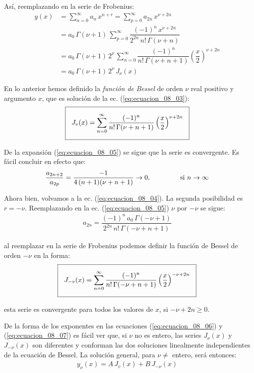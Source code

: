 Así, reemplazando en la serie de Frobenius:
\begin{align*}
y(x) &= \sum_{n=0}^{\infty} a_{n} \, x^{n+r} = \sum_{p=0}^{\infty} a_{2n} \, x^{\nu+2n} \\[0.5em]
&= a_{0} \, \Gamma (\nu + 1) \, \sum_{p=0}^{\infty} \dfrac{(-1)^{n} \, x^{\nu+2n}}{2^{2n} \, n! \, \Gamma (\nu + n)} \\[0.5em]
&= a_{0} \, \Gamma (\nu + 1) \, 2^{\nu} \, \sum_{n=0}^{\infty} \dfrac{(-1)^{n}}{n! \, \Gamma (\nu + n + 1)} \left( \dfrac{x}{2} \right)^{\nu+2n} \\[0.5em]
&= a_{0} \, \Gamma (\nu + 1) \, 2^{\nu} \, J_{\nu} (x)
\end{align*}

En lo anterior hemos definido la \emph{función de Bessel} de orden $\nu$ real positivo y argumento $x$, que es solución de la ec. (\ref{eq:ecuacion_08_03}):
\begin{align}
\setlength{\fboxsep}{3\fboxsep}\boxed{
J_{v} (x) = \sum_{n=0}^{\infty} \dfrac{(-1)^{n}}{n! \, \Gamma (\nu + n + 1)} \left( \dfrac{x}{2} \right)^{\nu+2n}}
\label{eq:ecuacion_08_06}
\end{align}

De la expansión (\ref{eq:ecuacion_08_05}) se sigue que la serie es convergente. Es fácil concluir en efecto que:
\begin{align*}
\dfrac{a_{2n+2}}{a_{2p}} = \dfrac{-1}{4 \, (n+1)(\nu + n + 1)} \to 0,\hspace{1.5cm} \mbox{si } n \to \infty
\end{align*}

Ahora bien, volvamos a la ec. (\ref{eq:ecuacion_08_04}). La segunda posibilidad es $r = -\nu$. Reemplazando en la ec. (\ref{eq:ecuacion_08_05}) $\nu$ por $-\nu$ se sigue:
\begin{align*}
a_{2n} = \dfrac{(-1)^{n} \, a_{0} \, \Gamma (-\nu + 1)}{2^{2n} \, n! \, \Gamma (-\nu + n + 1)}
\end{align*}

al reemplazar en la serie de Frobenius podemos definir la función de Bessel de orden $-\nu$ en la forma:
\begin{align}
\setlength{\fboxsep}{3\fboxsep}\boxed{
J_{-v} (x) = \sum_{n=0}^{\infty} \dfrac{(-1)^{n}}{n! \, \Gamma (-\nu + n + 1)} \left( \dfrac{x}{2} \right)^{-\nu+2n}}
\label{eq:ecuacion_08_07}
\end{align}

esta serie es convergente para todos los valores de $x$, si $-\nu + 2n \geq 0$.
\par
De la forma de los exponentes en las ecuaciones (\ref{eq:ecuacion_08_06}) y (\ref{eq:ecuacion_08_07}) es fácil ver que, si $\nu$ no es entero, las series $J_{\nu}(x)$ y $J_{-\nu}(x)$ son diferentes y conforman las dos soluciones linealmente independientes de la ecuación de Bessel. La solución general, para $\nu \neq$ entero, será entonces:
\begin{align*}
y_{\nu}(x) = A \, J_{v}(x) + B \, J_{-\nu} (x)
\end{align*}

